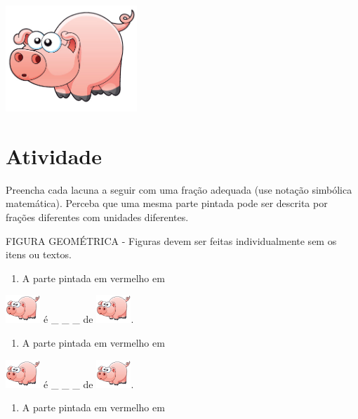 \documentclass[a4,12pt]{book}
\begin{document}
\includegraphics[width=\textwidth,height=4cm, keepaspectratio]{pig}
\section{Atividade}







Preencha cada lacuna a seguir com uma fração adequada (use notação simbólica matemática). Perceba que uma mesma parte pintada pode ser descrita por frações diferentes com unidades diferentes.
\begin{imagem*}[breakable]{}{}   FIGURA GEOMÉTRICA - Figuras devem ser feitas individualmente sem os itens ou textos.  
\end{imagem*}
\begin{enumerate} [\quad a)] %
  \item     A parte pintada em vermelho em 
\end{enumerate} %
\includegraphics[height=30pt, keepaspectratio]{pig} é \_ \_ \_   de \includegraphics[height=30pt, keepaspectratio]{pig}.
\begin{enumerate} [\quad a)] %
  \item     A parte pintada em vermelho em 
\end{enumerate} %
\includegraphics[height=30pt, keepaspectratio]{pig} é \_ \_ \_   de \includegraphics[height=30pt, keepaspectratio]{pig}.
\begin{enumerate} [\quad a)] %
  \item     A parte pintada em vermelho em 
\end{enumerate} %
\end{document}
